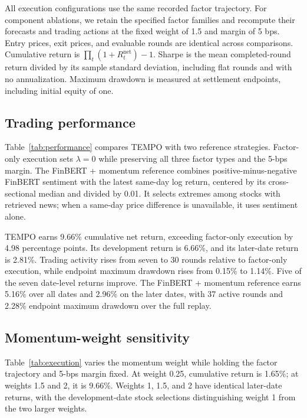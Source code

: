 \documentclass[conference]{IEEEtran}
\begin{document}
All execution configurations use the same recorded factor trajectory. For component ablations, we retain the specified factor families and recompute their forecasts and trading actions at the fixed weight of 1.5 and margin of 5 bps. Entry prices, exit prices, and evaluable rounds are identical across comparisons. Cumulative return is $\prod_t(1+R_t^{\mathrm{net}})-1$. Sharpe is the mean completed-round return divided by its sample standard deviation, including flat rounds and with no annualization. Maximum drawdown is measured at settlement endpoints, including initial equity of one.

\subsection{Trading performance}
Table~\ref{tab:performance} compares TEMPO with two reference strategies. Factor-only execution sets $\lambda=0$ while preserving all three factor types and the 5-bps margin. The FinBERT + momentum reference combines positive-minus-negative FinBERT sentiment\cite{araci2019} with the latest same-day log return, centered by its cross-sectional median and divided by 0.01. It selects extremes among stocks with retrieved news; when a same-day price difference is unavailable, it uses sentiment alone.

TEMPO earns 9.66\% cumulative net return, exceeding factor-only execution by 4.98 percentage points. Its development return is 6.66\%, and its later-date return is 2.81\%. Trading activity rises from seven to 30 rounds relative to factor-only execution, while endpoint maximum drawdown rises from 0.15\% to 1.14\%. Five of the seven date-level returns improve. The FinBERT + momentum reference earns 5.16\% over all dates and 2.96\% on the later dates, with 37 active rounds and 2.28\% endpoint maximum drawdown over the full replay.

\subsection{Momentum-weight sensitivity}
Table~\ref{tab:execution} varies the momentum weight while holding the factor trajectory and 5-bps margin fixed. At weight 0.25, cumulative return is 1.65\%; at weights 1.5 and 2, it is 9.66\%. Weights 1, 1.5, and 2 have identical later-date returns, with the development-date stock selections distinguishing weight 1 from the two larger weights.
\end{document}
